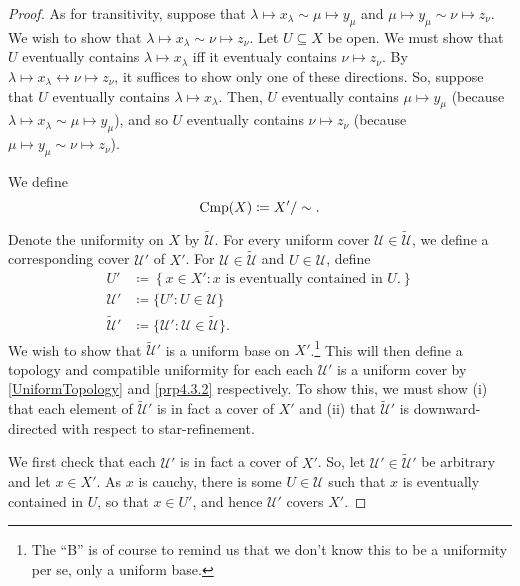 \begin{thm}[Completion]
\begin{savenotes}
\begin{proof}
As for transitivity, suppose that $\lambda \mapsto x_\lambda \sim \mu \mapsto y_\mu $ and $\mu \mapsto y_\mu \sim \nu \mapsto z_\nu$.  We wish to show that $\lambda \mapsto x_\lambda \sim \nu \mapsto z_\nu $.  Let $U\subseteq X$ be open.  We must show that $U$ eventually contains $\lambda \mapsto x_\lambda$ iff it eventualy contains $\nu \mapsto z_\nu$.  By $\lambda \mapsto x_\lambda \leftrightarrow \nu \mapsto z_\nu$, it suffices to show only one of these directions.  So, suppose that $U$ eventually contains $\lambda \mapsto x_\lambda$.  Then, $U$ eventually contains $\mu \mapsto y_\mu$ (because $\lambda \mapsto x_\lambda \sim \mu \mapsto y_\mu$), and so $U$ eventually contains $\nu \mapsto z_\nu$ (because $\mu \mapsto y_\mu \sim \nu \mapsto z_\nu$).

We define
\begin{equation}
\operatorname{Cmp} (X)\coloneqq X'/\sim .
\end{equation}

Denote the uniformity on $X$ by $\widetilde{\mathcal{U}}$.  For every uniform cover $\mathcal{U}\in \widetilde{\mathcal{U}}$, we define a corresponding cover $\mathcal{U}'$ of $X'$.  For $\mathcal{U}\in \widetilde{\mathcal{U}}$ and $U\in \mathcal{U}$, define
\begin{equation}\label{B.26}
\begin{split}
U' & \coloneqq \left\{ x\in X':x\text{ is eventually contained in }U\text{.}\right\} \\
\mathcal{U}' & \coloneqq \{ U':U\in \mathcal{U}\} \\
\widetilde{\mathcal{U}}' & \coloneqq \{ \mathcal{U}':\mathcal{U}\in \widetilde{\mathcal{U}}\} .
\end{split}
\end{equation}
We wish to show that $\widetilde{\mathcal{U}}'$ is a uniform base on $X'$.\footnote{The ``B'' is of course to remind us that we don't know this to be a uniformity per se, only a uniform base.}  This will then define a topology and compatible uniformity for each each $\mathcal{U}'$ is a uniform cover by \cref{UniformTopology} and \cref{prp4.3.2} respectively.  To show this, we must show (i) that each element of $\widetilde{\mathcal{U}}'$ is in fact a cover of $X'$ and (ii) that $\widetilde{\mathcal{U}}'$ is downward-directed with respect to star-refinement.

We first check that each $\mathcal{U}'$ is in fact a cover of $X'$.  So, let $\mathcal{U}'\in \widetilde{\mathcal{U}}'$ be arbitrary and let $x\in X'$.  As $x$ is cauchy, there is some $U\in \mathcal{U}$ such that $x$ is eventually contained in $U$, so that $x\in U'$, and hence $\mathcal{U}'$ covers $X'$.


\end{proof}
\end{savenotes}
\end{thm}
